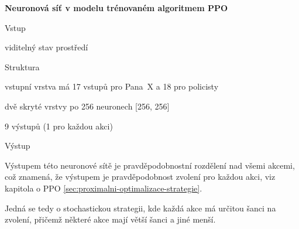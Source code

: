   \textbf{Neuronová síť v modelu trénovaném algoritmem PPO}
    \begin{myitemize}
      \item Vstup
        \begin{myitemize}
          \item viditelný stav prostředí
        \end{myitemize}
      \item Struktura
        \begin{myitemize}
          \item vstupní vrstva má 17 vstupů pro Pana~X a 18 pro policisty
          \item dvě skryté vrstvy po 256 neuronech [256, 256]
          \item 9 výstupů (1 pro každou akci)
        \end{myitemize}
      \item Výstup
        \begin{myitemize}
          \item Výstupem této neuronové sítě je pravděpodobnostní rozdělení nad všemi akcemi, což znamená, že výstupem je pravděpodobnost zvolení pro každou akci, viz kapitola o PPO \ref{sec:proximalni-optimalizace-strategie}.
          \item Jedná se tedy o stochastickou strategii, kde každá akce má určitou šanci na zvolení, přičemž některé akce mají větší šanci a jiné menší.
        \end{myitemize}
    \end{myitemize}

